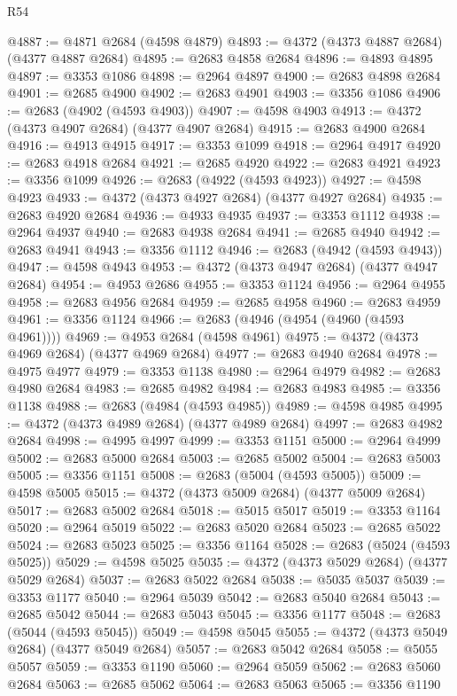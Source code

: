 \begin{lexlean}{R54}
\begin{coremodule}
@4887 := @4871 @2684 (@4598 @4879)
@4893 := @4372 (@4373 @4887 @2684) (@4377 @4887 @2684)
@4895 := @2683 @4858 @2684
@4896 := @4893 @4895
@4897 := @3353 @1086
@4898 := @2964 @4897
@4900 := @2683 @4898 @2684
@4901 := @2685 @4900
@4902 := @2683 @4901
@4903 := @3356 @1086
@4906 := @2683 (@4902 (@4593 @4903))
@4907 := @4598 @4903
@4913 := @4372 (@4373 @4907 @2684) (@4377 @4907 @2684)
@4915 := @2683 @4900 @2684
@4916 := @4913 @4915
@4917 := @3353 @1099
@4918 := @2964 @4917
@4920 := @2683 @4918 @2684
@4921 := @2685 @4920
@4922 := @2683 @4921
@4923 := @3356 @1099
@4926 := @2683 (@4922 (@4593 @4923))
@4927 := @4598 @4923
@4933 := @4372 (@4373 @4927 @2684) (@4377 @4927 @2684)
@4935 := @2683 @4920 @2684
@4936 := @4933 @4935
@4937 := @3353 @1112
@4938 := @2964 @4937
@4940 := @2683 @4938 @2684
@4941 := @2685 @4940
@4942 := @2683 @4941
@4943 := @3356 @1112
@4946 := @2683 (@4942 (@4593 @4943))
@4947 := @4598 @4943
@4953 := @4372 (@4373 @4947 @2684) (@4377 @4947 @2684)
@4954 := @4953 @2686
@4955 := @3353 @1124
@4956 := @2964 @4955
@4958 := @2683 @4956 @2684
@4959 := @2685 @4958
@4960 := @2683 @4959
@4961 := @3356 @1124
@4966 := @2683 (@4946 (@4954 (@4960 (@4593 @4961))))
@4969 := @4953 @2684 (@4598 @4961)
@4975 := @4372 (@4373 @4969 @2684) (@4377 @4969 @2684)
@4977 := @2683 @4940 @2684
@4978 := @4975 @4977
@4979 := @3353 @1138
@4980 := @2964 @4979
@4982 := @2683 @4980 @2684
@4983 := @2685 @4982
@4984 := @2683 @4983
@4985 := @3356 @1138
@4988 := @2683 (@4984 (@4593 @4985))
@4989 := @4598 @4985
@4995 := @4372 (@4373 @4989 @2684) (@4377 @4989 @2684)
@4997 := @2683 @4982 @2684
@4998 := @4995 @4997
@4999 := @3353 @1151
@5000 := @2964 @4999
@5002 := @2683 @5000 @2684
@5003 := @2685 @5002
@5004 := @2683 @5003
@5005 := @3356 @1151
@5008 := @2683 (@5004 (@4593 @5005))
@5009 := @4598 @5005
@5015 := @4372 (@4373 @5009 @2684) (@4377 @5009 @2684)
@5017 := @2683 @5002 @2684
@5018 := @5015 @5017
@5019 := @3353 @1164
@5020 := @2964 @5019
@5022 := @2683 @5020 @2684
@5023 := @2685 @5022
@5024 := @2683 @5023
@5025 := @3356 @1164
@5028 := @2683 (@5024 (@4593 @5025))
@5029 := @4598 @5025
@5035 := @4372 (@4373 @5029 @2684) (@4377 @5029 @2684)
@5037 := @2683 @5022 @2684
@5038 := @5035 @5037
@5039 := @3353 @1177
@5040 := @2964 @5039
@5042 := @2683 @5040 @2684
@5043 := @2685 @5042
@5044 := @2683 @5043
@5045 := @3356 @1177
@5048 := @2683 (@5044 (@4593 @5045))
@5049 := @4598 @5045
@5055 := @4372 (@4373 @5049 @2684) (@4377 @5049 @2684)
@5057 := @2683 @5042 @2684
@5058 := @5055 @5057
@5059 := @3353 @1190
@5060 := @2964 @5059
@5062 := @2683 @5060 @2684
@5063 := @2685 @5062
@5064 := @2683 @5063
@5065 := @3356 @1190

\end{coremodule}
\end{lexlean}
